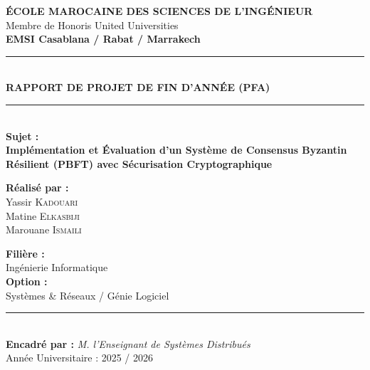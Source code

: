 \documentclass[11pt,a4paper]{article}
\begin{document}
\begin{titlepage}
    \centering
    \vspace*{0.5cm}
    {\Large \textbf{ÉCOLE MAROCAINE DES SCIENCES DE L'INGÉNIEUR}}\\[0.2cm]
    {\large Membre de Honoris United Universities}\\[0.1cm]
    {\large \textbf{EMSI Casablana / Rabat / Marrakech}}\\[1.0cm]
    
    \rule{\linewidth}{1.5pt} \\[0.4cm]
    {\Huge \bfseries RAPPORT DE PROJET DE FIN D'ANNÉE (PFA)} \\[0.4cm]
    \rule{\linewidth}{1.5pt} \\[1.0cm]
    
    {\large \textbf{Sujet :}} \\[0.2cm]
    {\Large \bfseries \color{emsiblue} Implémentation et Évaluation d'un Système de Consensus Byzantin Résilient (PBFT) avec Sécurisation Cryptographique} \\[1.5cm]
    
    \begin{minipage}{0.5\textwidth}
        \begin{flushleft} \large
            \textbf{Réalisé par :} \\
            Yassir \textsc{Kadouari} \\
            Matine \textsc{Elkasbiji} \\
            Marouane \textsc{Ismaili}
        \end{flushleft}
    \end{minipage}
    \begin{minipage}{0.4\textwidth}
        \begin{flushright} \large
            \textbf{Filière :} \\
            Ingénierie Informatique \\
            \textbf{Option :} \\
            Systèmes \& Réseaux / Génie Logiciel
        \end{flushright}
    \end{minipage}
    
    \vfill
    {\rule{8cm}{0.5pt}}\\[0.3cm]
    {\large \textbf{Encadré par :} \textit{M. l'Enseignant de Systèmes Distribués}} \\[1.5cm]
    
    {\large Année Universitaire : 2025 / 2026}
\end{titlepage}
\end{document}
